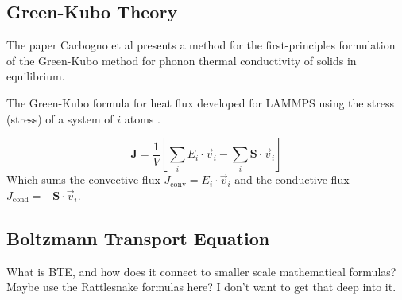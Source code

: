 \autocite{ashcroftSolidStatePhysics1976} %

\subsection{Green-Kubo Theory}

The paper Carbogno et al \autocite{carbognoInitioGreenKuboApproach2017} presents a method for the first-principles formulation of the Green-Kubo method for phonon thermal conductivity of solids in equilibrium. 

The Green-Kubo formula for heat flux developed for LAMMPS using the stress (\gls{stress}) of a system of $i$ atoms \autocite{surblysApplicationAtomicStress2019}.

\begin{equation}
    \boldsymbol{J}=\frac{1}{V}\left[ \sum_i E_i \cdot \vec{v}_i - \sum_{i}\boldsymbol{S} \cdot\vec{v}_i \right]
\end{equation}
Which sums the convective flux $J_\text{conv}=E_i \cdot \vec{v}_i$ and the conductive flux $J_\text{cond}=-\boldsymbol{S} \cdot\vec{v}_i$.


\autocite{knoopInitioGreenKuboSimulations2023} %

\autocite{surblysApplicationAtomicStress2019} %
\autocite{surblysMethodologyMeaningComputing2021} %

\autocite{zhangGreenKuboFormalismThermal2023} %

\subsection{Boltzmann Transport Equation}

What is BTE, and how does it connect to smaller scale mathematical formulas?
\autocite{ashcroftSolidStatePhysics1976} %
\autocite{harterPredictingMesoscaleSpectral2020} %
Maybe use the Rattlesnake formulas here? I don't want to get that deep into it.
\autocite{harterCharacterizationThermalConductivity2015} %

\clearpage